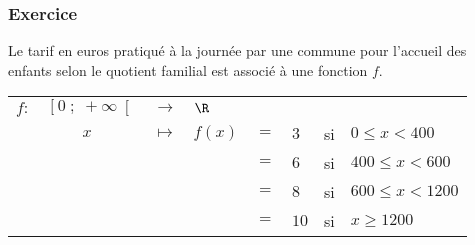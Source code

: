 \subsubsection{Exercice }

Le tarif en euros pratiqué à la journée par une commune pour l'accueil des enfants selon le quotient familial est associé à une fonction $f$. \\

\begin{tabular}{llllllll}
\hspace*{-.3cm} $f:$ & $\left[0 \; ; \; +\infty\right[$ & $\longrightarrow$ & $\R$ \\
& $\; \; \; \; \; \; \; \; x$ & $\longmapsto$ & $f(x)$ & $=$ & $3$ & si & $0 \leqslant x < 400$ \\
& & & & $=$ & $6$ & si & $400 \leqslant x < 600$ \\
& & & & $=$ & $8$ & si & $600 \leqslant x < 1200$ \\
& & & & $=$ & $10$ & si & $x \geqslant 1200$ \\
\end{tabular}

\vspace*{.3cm}

